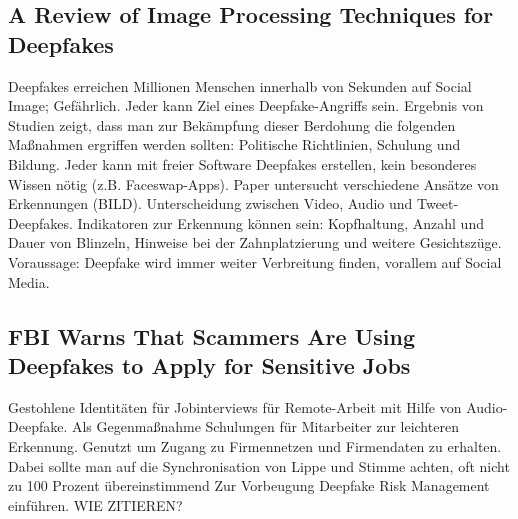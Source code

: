 \subsection{A Review of Image Processing Techniques for Deepfakes}
Deepfakes erreichen Millionen Menschen innerhalb von Sekunden auf Social Image; Gefährlich.
Jeder kann Ziel eines Deepfake-Angriffs sein.
Ergebnis von Studien zeigt, dass man zur Bekämpfung dieser Berdohung die folgenden Maßnahmen ergriffen werden sollten:
Politische Richtlinien, Schulung und Bildung.
Jeder kann mit freier Software Deepfakes erstellen, kein besonderes Wissen nötig (z.B. Faceswap-Apps).
Paper untersucht verschiedene Ansätze von Erkennungen (BILD).
Unterscheidung zwischen Video, Audio und Tweet-Deepfakes.
Indikatoren zur Erkennung können sein: Kopfhaltung, Anzahl und Dauer von Blinzeln, Hinweise bei der Zahnplatzierung und weitere Gesichtszüge.
Voraussage: Deepfake wird immer weiter Verbreitung finden, vorallem auf Social Media.
\cite{Shahzad2022}

\subsection{FBI Warns That Scammers Are Using Deepfakes to Apply for Sensitive Jobs}
Gestohlene Identitäten für Jobinterviews für Remote-Arbeit mit Hilfe von Audio-Deepfake.
Als Gegenmaßnahme Schulungen für Mitarbeiter zur leichteren Erkennung.
Genutzt um Zugang zu Firmennetzen und Firmendaten zu erhalten.
Dabei sollte man auf die Synchronisation von Lippe und Stimme achten, oft nicht zu 100 Prozent übereinstimmend
Zur Vorbeugung Deepfake Risk Management einführen.
WIE ZITIEREN?